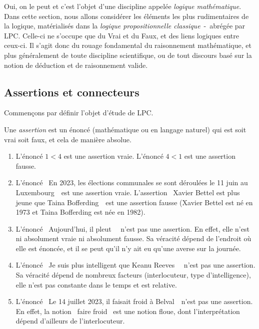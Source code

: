 \documentclass[french,course,oneside,theoremnosection]{lecture}
\begin{document}
Oui, on le peut et c'est l'objet d'une discipline appelée \emph{logique mathématique}. Dans cette section, nous allons considérer les éléments les plus rudimentaires de la logique, matérialisés dans la \emph{logique propositionnelle classique}~-~abrégée par LPC. Celle-ci ne s'occupe que du Vrai et du Faux, et des liens logiques entre ceux-ci. Il s'agit donc du rouage fondamental du raisonnement mathématique, et plus généralement de toute discipline scientifique, ou de tout discours basé sur la notion de déduction et de raisonnement valide.

\subsection{Assertions et connecteurs}

Commençons par définir l'objet d'étude de LPC.
\begin{definition} Une \emph{assertion} est un énoncé (mathématique ou en langage naturel) qui est soit vrai soit faux, et cela de manière absolue.
\end{definition}
\begin{example}
\begin{enumerate}¸
\item L'énoncé $1 < 4$ est une assertion vraie. L'énoncé $4<1$ est une assertion fausse.
\item L'énoncé \og~En 2023, les élections communales se sont déroulées le 11 juin au Luxembourg~\fg{}~est une assertion vraie. L'assertion \og~Xavier Bettel est plus jeune que Taina Bofferding~\fg{}~est une assertion fausse (Xavier Bettel est né en  1973 et Taina Bofferding est née en 1982).
\item L'énoncé \og~Aujourd'hui, il pleut~\fg{}~ n'est pas une assertion. En effet, elle n'est ni absolument vraie ni absolument fausse. Sa véracité dépend de l'endroit où elle est énoncée, et il se peut qu'il n'y ait eu qu'une averse sur la journée.
\item L'énoncé \og~Je suis plus intelligent que Keanu Reeves~\fg{}~ n'est pas une assertion. Sa véracité dépend de nombreux facteurs (interlocuteur, type d'intelligence), elle n'est  pas constante dans le temps et est relative.
\item L'énoncé \og~Le 14 juillet 2023, il faisait froid à Belval~\fg{}~n'est pas une assertion. En effet, la notion \og~faire froid~\fg{} est une notion floue, dont l'interprétation dépend d'ailleurs de l'interlocuteur.
\end{enumerate}
\end{example}
\end{document}
